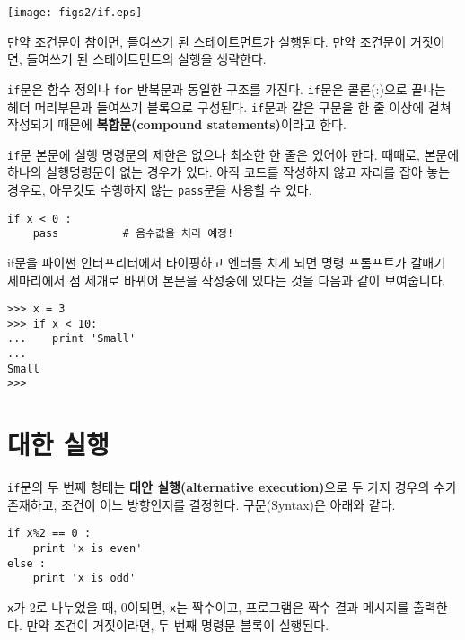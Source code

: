 \beforefig
\centerline{\texttt{[image: figs2/if.eps]}}
\afterfig

만약 조건문이 참이면, 들여쓰기 된 스테이트먼트가 실행된다. 만약 조건문이 거짓이면, 들여쓰기 된 스테이트먼트의 실행을 생략한다.


{\tt if}문은 함수 정의나 {\tt for} 반복문과 동일한 구조를 가진다.
{\tt if}문은 콜론(:)으로 끝나는 헤더 머리부문과 들여쓰기 블록으로 구성된다.
{\tt if}문과 같은 구문을 한 줄 이상에 걸쳐 작성되기 때문에 {\bf 복합문(compound statements)}이라고 한다.

{\tt if}문 본문에 실행 명령문의 제한은 없으나 최소한 한 줄은 있어야 한다.
때때로, 본문에 하나의 실행명령문이 없는 경우가 있다. 아직 코드를 작성하지 않고 자리를 잡아 놓는 경우로, 아무것도 수행하지 않는 {\tt pass}문을 사용할 수 있다.


\beforeverb
\begin{verbatim}
if x < 0 :
    pass          # 음수값을 처리 예정!
\end{verbatim}
\afterverb
%
if문을 파이썬 인터프리터에서 타이핑하고 엔터를 치게 되면 명령 프롬프트가 갈매기 세마리에서 점 세개로 바뀌어 본문을 작성중에 있다는 것을 다음과 같이 보여줍니다.

\beforeverb
\begin{verbatim}
>>> x = 3
>>> if x < 10:
...    print 'Small'
... 
Small
>>>
\end{verbatim}
\afterverb
%

\section{대한 실행}


{\tt if}문의 두 번째 형태는 {\bf 대안 실행(alternative execution)}으로 두 가지 경우의 수가 존재하고, 조건이 어느 방향인지를 결정한다. 구문(Syntax)은 아래와 같다.   

\beforeverb
\begin{verbatim}
if x%2 == 0 :
    print 'x is even'
else :
    print 'x is odd'
\end{verbatim}
\afterverb
%
{\tt x}가 2로 나누었을 때, 0이되면, {\tt x}는 짝수이고, 프로그램은 짝수 결과 메시지를 출력한다. 만약 조건이 거짓이라면, 두 번째 명령문 블록이 실행된다.

